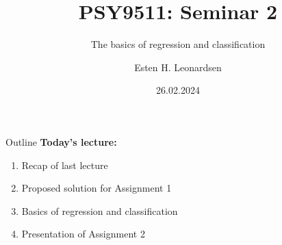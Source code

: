 \documentclass[10pt]{beamer}
\title{PSY9511: Seminar 2}
\subtitle{The basics of regression and classification}
\author{Esten H. Leonardsen}
\date{26.02.2024}
\begin{document}
	\begin{frame}
	 	\titlepage
	\end{frame}

    \begin{frame}{Outline}
        \textbf{Today's lecture:}
        \begin{enumerate}
            \item Recap of last lecture
            \item Proposed solution for Assignment 1
            \item Basics of regression and classification
            \item Presentation of Assignment 2
        \end{enumerate}
    \end{frame}

    
    
\end{document}
